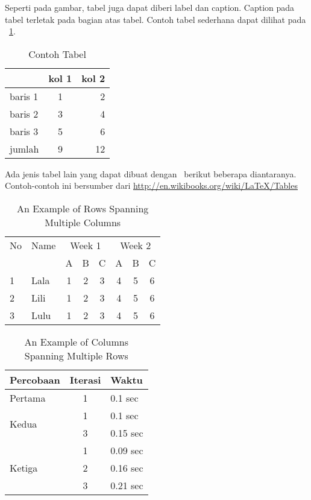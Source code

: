 Seperti pada gambar, tabel juga dapat diberi label dan caption. 
Caption pada tabel terletak pada bagian atas tabel. 
Contoh tabel sederhana dapat dilihat pada \tab~\ref{tab:tab1}.

\begin{table}
	\centering
	\caption{Contoh Tabel}
	\label{tab:tab1}
	\begin{tabular}{| l | c r |}
		\hline
		& kol 1 & kol 2 \\ 
		\hline
		baris 1 & 1 & 2 \\
		baris 2 & 3 & 4 \\
		baris 3 & 5 & 6 \\
		jumlah  & 9 & 12 \\
		\hline
	\end{tabular}
\end{table}

Ada jenis tabel lain yang dapat dibuat dengan \latex~berikut 
beberapa diantaranya. 
Contoh-contoh ini bersumber dari 
\url{http://en.wikibooks.org/wiki/LaTeX/Tables}

\begin{table}
	\centering
	\caption{An Example of Rows Spanning Multiple Columns}
	\label{row.spanning}
	\begin{tabular}{|l|l|*{6}{c|}}
  		\hline %
  		No & Name & \multicolumn{3}{|c|}{Week 1} & \multicolumn{3}{|c|}{Week 2} \\
  		\cline{3-8} %
  		& & A & B & C & A & B & C\\
  		\hline
  		1 & Lala & 1 & 2 & 3 & 4 & 5 & 6\\
  		2 & Lili & 1 & 2 & 3 & 4 & 5 & 6\\
  		3 & Lulu & 1 & 2 & 3 & 4 & 5 & 6\\
  		\hline
	\end{tabular}
\end{table}

\begin{table}
	\centering
	\caption{An Example of Columns Spanning Multiple Rows}
	\label{column.spanning}
	\begin{tabular}{|l|c|l|}
		\hline
		Percobaan & Iterasi & Waktu \\
		\hline
		Pertama & 1 & 0.1 sec \\ \hline
		\multirow{2}{*}{Kedua} & 1 & 0.1 sec \\
 		& 3 & 0.15 sec \\ 
 		\hline
		\multirow{3}{*}{Ketiga} & 1 & 0.09 sec \\
 		& 2 & 0.16 sec \\
 		& 3 & 0.21 sec \\ 
 		\hline
	\end{tabular}
\end{table}

